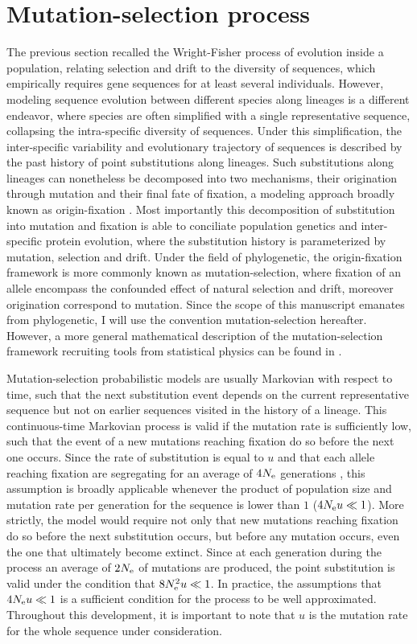 \section{Mutation-selection process}
The previous section recalled the Wright-Fisher process of evolution inside a population, relating selection and drift to the diversity of sequences, which empirically requires gene sequences for at least several individuals.
However, modeling sequence evolution between different species along lineages is a different endeavor, where species are often simplified with a single representative sequence, collapsing the intra-specific diversity of sequences.
Under this simplification, the inter-specific variability and evolutionary trajectory of sequences is described by the past history of point substitutions along lineages.
Such substitutions along lineages can nonetheless be decomposed into two mechanisms, their origination through mutation and their final fate of fixation, a modeling approach broadly known as origin-fixation \citep{McCandlish2014}.
Most importantly this decomposition of \gls{substitution} into mutation and fixation is able to conciliate population genetics and inter-specific protein evolution, where the \gls{substitution} history is parameterized by mutation, selection and drift.
Under the field of phylogenetic, the origin-fixation framework is more commonly known as mutation-selection, where fixation of an \gls{allele} encompass the confounded effect of natural selection and drift, moreover origination correspond to mutation.
Since the scope of this manuscript emanates from phylogenetic, I will use the convention mutation-selection hereafter.
However, a more general mathematical description of the mutation-selection framework recruiting tools from statistical physics can be found in \citet{Sella2005, Mustonen2009}.

Mutation-selection probabilistic models are usually Markovian with respect to time, such that the next \gls{substitution} event depends on the current representative sequence but not on earlier sequences visited in the history of a lineage.
This continuous-time Markovian process is valid if the mutation rate is sufficiently low, such that the event of a new mutations reaching fixation do so before the next one occurs. 
Since the rate of \gls{substitution} is equal to $u$ and that each \gls{allele} reaching fixation are segregating for an average of $4 N_{\textrm{e}}$ generations \citep{Kimura1969}, this assumption is broadly applicable whenever the product of population size and mutation rate per generation for the sequence is lower than $1$ ($4 N_{\textrm{e}} u \ll 1$).
More strictly, the model would require not only that new mutations reaching fixation do so before the next \gls{substitution} occurs, but before any mutation occurs, even the one that ultimately become extinct.
Since at each generation during the process an average of $2N_{\textrm{e}}$ of mutations are produced, the point \gls{substitution} is valid under the condition that $8N_{\textrm{e}}^2 u \ll 1$.
In practice, the assumptions that $4 N_{\textrm{e}} u \ll 1$ is a sufficient condition for the process to be well approximated.
Throughout this development, it is important to note that $u$ is the mutation rate for the whole sequence under consideration.

